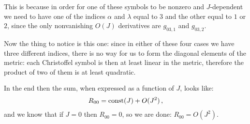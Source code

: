 \documentclass[main.tex]{subfiles}
\begin{document}
This is because in order for one of these symbols to be nonzero and \(J\)-dependent we need to have one of the indices \(\alpha \) and \(\lambda \) equal to \(3\) and the other equal to \(1\) or \(2\), since the only nonvanishing \(O(J)\) derivatives are \(g_{03,1}\) and \(g_{03, 2}\). 


Now the thing to notice is this one: since in either of these four cases we have three different indices, there is no way for us to form the diagonal elements of the metric: each Christoffel symbol is then at least linear in the metric, therefore the product of two of them is at least quadratic. 

In the end then the sum, when expressed as a function of \(J\), looks like: 
%
\begin{align}
  R_{00} = \text{const}(J)+  O(J^2)
\,,
\end{align}
%
and we know that if \(J=0\) then \(R_{00} = 0\), so we are done: \(R_{00} = O(J^2)\). 
\end{document}
